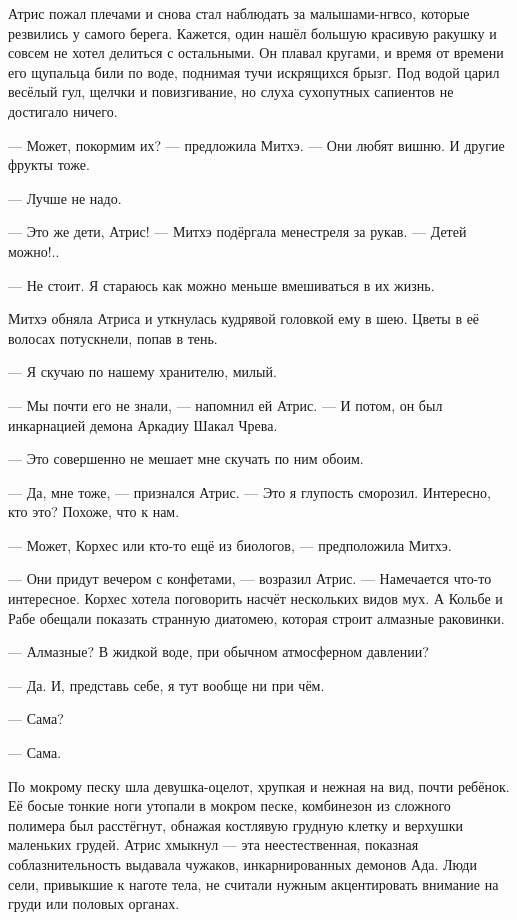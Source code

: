 Атрис пожал плечами и снова стал наблюдать за малышами-нгвсо, которые резвились у самого берега.
Кажется, один нашёл большую красивую ракушку и совсем не хотел делиться с остальными.
Он плавал кругами, и время от времени его щупальца били по воде, поднимая тучи искрящихся брызг.
Под водой царил весёлый гул, щелчки и повизгивание, но слуха сухопутных сапиентов не достигало ничего.

--- Может, покормим их? --- предложила Митхэ.
--- Они любят вишню.
И другие фрукты тоже.

--- Лучше не надо.

--- Это же дети, Атрис! --- Митхэ подёргала менестреля за рукав.
--- Детей можно!..

--- Не стоит.
Я стараюсь как можно меньше вмешиваться в их жизнь.

Митхэ обняла Атриса и уткнулась кудрявой головкой ему в шею.
Цветы в её волосах потускнели, попав в тень.

--- Я скучаю по нашему хранителю, милый.

--- Мы почти его не знали, --- напомнил ей Атрис.
--- И потом, он был инкарнацией демона Аркадиу Шакал Чрева.

--- Это совершенно не мешает мне скучать по ним обоим.

--- Да, мне тоже, --- признался Атрис.
--- Это я глупость сморозил.
Интересно, кто это?
Похоже, что к нам.

--- Может, Корхес или кто-то ещё из биологов, --- предположила Митхэ.

--- Они придут вечером с конфетами, --- возразил Атрис.
--- Намечается что-то интересное.
Корхес хотела поговорить насчёт нескольких видов мух.
А Кольбе и Рабе обещали показать странную диатомею, которая строит алмазные раковинки.

--- Алмазные?
В жидкой воде, при обычном атмосферном давлении?

--- Да.
И, представь себе, я тут вообще ни при чём.

--- Сама?

--- Сама.

По мокрому песку шла девушка-оцелот, хрупкая и нежная на вид, почти ребёнок.
Её босые тонкие ноги утопали в мокром песке, комбинезон из сложного полимера был расстёгнут, обнажая костлявую грудную клетку и верхушки маленьких грудей.
Атрис хмыкнул --- эта неестественная, показная соблазнительность выдавала чужаков, инкарнированных демонов Ада.
Люди сели, привыкшие к наготе тела, не считали нужным акцентировать внимание на груди или половых органах.

